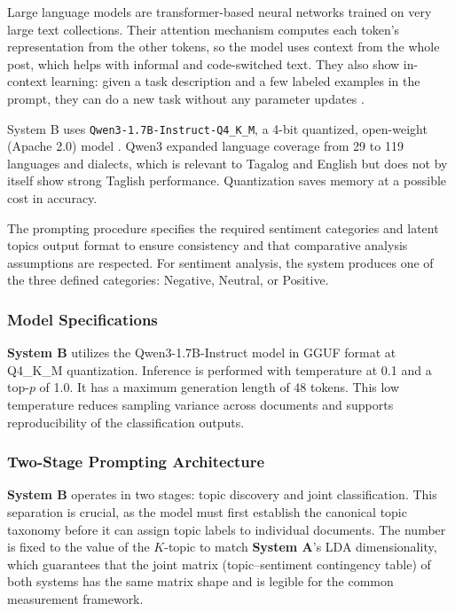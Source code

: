 \documentclass[12pt,a4paper]{report}
\newcommand{\sysA}{\textbf{System A}}
\newcommand{\sysB}{\textbf{System B}}
\newcommand{\qwen}{\texttt{Qwen3-1.7B-Instruct-Q4\_K\_M}}
\begin{document}
Large language models are transformer-based neural networks
\parencite{vaswani2017} trained on very large text collections. Their attention
mechanism computes each token's representation from the other tokens, so the
model uses context from the whole post, which helps with informal and
code-switched text. They also show in-context learning: given a task
description and a few labeled examples in the prompt, they can do a new task
without any parameter updates \parencite{brown2020}.

System B uses \qwen, a 4-bit quantized, open-weight (Apache 2.0) model
\parencite{yang2025}. Qwen3 expanded language coverage from 29 to 119 languages
and dialects, which is relevant to Tagalog and English but does not by itself
show strong Taglish performance. Quantization saves memory at a possible cost
in accuracy.


The prompting procedure specifies the required sentiment categories and latent topics
output format to ensure consistency and that comparative analysis assumptions
are respected. For sentiment analysis, the system produces one of the three
defined categories: Negative, Neutral, or Positive.

\subsubsection{Model Specifications}

\sysB{} utilizes the Qwen3-1.7B-Instruct model in GGUF format at Q4\_K\_M
quantization. Inference is performed with temperature at 0.1 and a top-$p$ of
1.0. It has a maximum generation length of 48 tokens. This low temperature
reduces sampling variance across documents and supports reproducibility of the
classification outputs.

\subsubsection{Two-Stage Prompting Architecture}

\sysB{} operates in two stages: topic discovery and joint classification. This
separation is crucial, as the model must first establish the canonical topic
taxonomy before it can assign topic labels to individual documents. The number
is fixed to the value of the $K$-topic to match \sysA's LDA dimensionality,
which guarantees that the joint matrix (topic--sentiment contingency table) of
both systems has the same matrix shape and is legible for the common
measurement framework.
\end{document}
